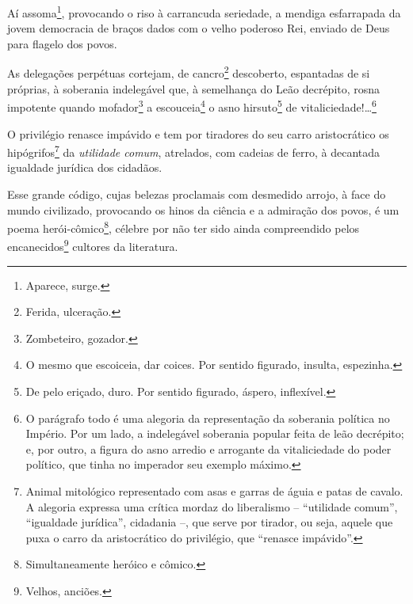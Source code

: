 Aí assoma\footnote{Aparece, surge.}, provocando o riso à carrancuda
seriedade, a mendiga esfarrapada da jovem democracia de braços dados com
o velho poderoso Rei, enviado de Deus para flagelo dos povos.

As delegações perpétuas cortejam, de cancro\footnote{Ferida,
  ulceração.} descoberto, espantadas de si próprias, à soberania
indelegável que, à semelhança do Leão decrépito, rosna impotente quando
mofador\footnote{Zombeteiro, gozador.} a escouceia\footnote{O mesmo
  que escoiceia, dar coices. Por sentido figurado, insulta, espezinha.}
o asno hirsuto\footnote{De pelo eriçado, duro. Por sentido figurado,
  áspero, inflexível.} de vitaliciedade!\ldots{}\footnote{O parágrafo todo
  é uma alegoria da representação da soberania política no Império. Por
  um lado, a indelegável soberania popular feita de leão decrépito; e,
  por outro, a figura do asno arredio e arrogante da vitaliciedade do
  poder político, que tinha no imperador seu exemplo máximo.}

O privilégio renasce impávido e tem por tiradores do seu carro
aristocrático os hipógrifos\footnote{Animal mitológico representado
  com asas e garras de águia e patas de cavalo. A alegoria expressa uma
  crítica mordaz do liberalismo -- ``utilidade comum'', ``igualdade
  jurídica'', cidadania --, que serve por tirador, ou seja, aquele que
  puxa o carro da aristocrático do privilégio, que ``renasce impávido''.}
da \emph{utilidade comum}, atrelados, com cadeias de ferro, à decantada
igualdade jurídica dos cidadãos.

Esse grande código, cujas belezas proclamais com desmedido arrojo, à
face do mundo civilizado, provocando os hinos da ciência e a admiração
dos povos, é um poema herói-cômico\footnote{Simultaneamente heróico e
  cômico.}, célebre por não ter sido ainda compreendido pelos
encanecidos\footnote{Velhos, anciões.} cultores da literatura.

